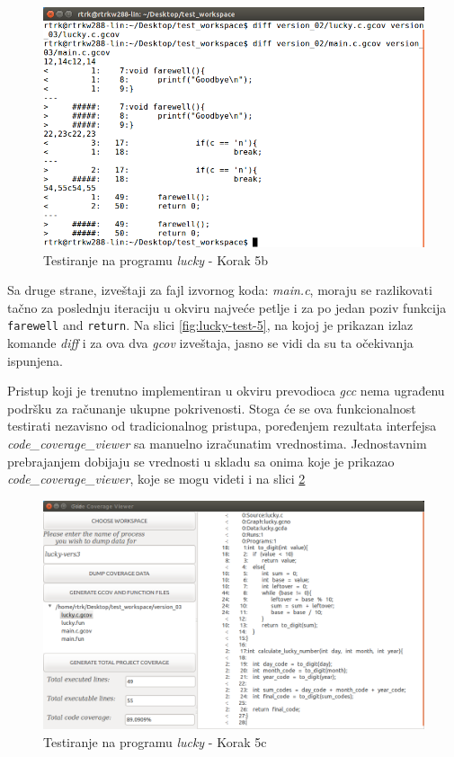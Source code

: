 \documentclass[12pt,oneside]{memoir}
\newcommand{\kod}[1]{\texttt{#1}}
\newcommand{\strano}[1]{\textit{#1}}
\begin{document}
\begin{figure}[!ht]
  \centering
  \includegraphics[width=\textwidth]{img/lucky6-ng.png}
  \caption{Testiranje na programu \strano{lucky} - Korak 5b}
  \label{fig:lucky-test-6}
\end{figure}

Sa druge strane, izveštaji za fajl izvornog koda: \strano{main.c}, moraju se razlikovati tačno za poslednju iteraciju u okviru najveće petlje i za po jedan poziv funkcija \kod{farewell} and \kod{return}. Na slici \ref{fig:lucky-test-5}, na kojoj je prikazan izlaz komande \strano{diff} i za ova dva \strano{gcov} izveštaja, jasno se vidi da su ta očekivanja ispunjena. 

Pristup koji je trenutno implementiran u okviru prevodioca \strano{gcc} nema ugrađenu podršku za računanje ukupne pokrivenosti. Stoga će se ova funkcionalnost testirati nezavisno od tradicionalnog pristupa, poređenjem rezultata interfejsa \\ \strano{code\_coverage\_viewer} sa manuelno izračunatim vrednostima. Jednostavnim prebrajanjem dobijaju se vrednosti u skladu sa onima koje je prikazao \\ \strano{code\_coverage\_viewer}, koje se mogu videti i na slici \ref{fig:lucky-test-7}

\begin{figure}[!ht]
  \centering
  \includegraphics[width=\textwidth]{img/lucky7-ng.png}
  \caption{Testiranje na programu \strano{lucky} - Korak 5c}
  \label{fig:lucky-test-7}
\end{figure}
\end{document}
